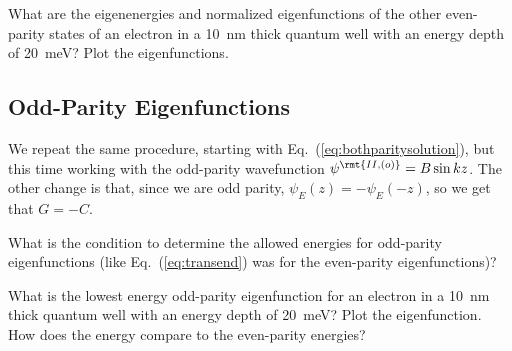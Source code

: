 \begin{example}
\begin{marginfigure}
\caption{ }
\label{fig:301b}
\end{marginfigure}

\end{example}

\begin{exercise}
What are the eigenenergies and normalized eigenfunctions of the other even-parity states of  an electron in a 10~nm thick quantum well with an energy depth of 20~meV? Plot the eigenfunctions.
\end{exercise}

\subsection{Odd-Parity Eigenfunctions}

We repeat the same procedure, starting with Eq.~(\ref{eq:bothparitysolution}), but this time working with the odd-parity wavefunction $\psi^\rmt{II,(o)} = B\sin kz$. The other change is that, since we are odd parity, $\psi_E(z) = -\psi_E(-z)$, so we get that $G = -C$.

\begin{exercise}
What is the condition to determine the allowed energies for odd-parity eigenfunctions (like Eq.~(\ref{eq:transend}) was for the even-parity eigenfunctions)?
\end{exercise}

\begin{exercise}
What is the lowest energy odd-parity eigenfunction for an electron in a 10~nm thick quantum well with an energy depth of 20~meV? Plot the eigenfunction. How does the energy compare to the even-parity energies?
\end{exercise}

